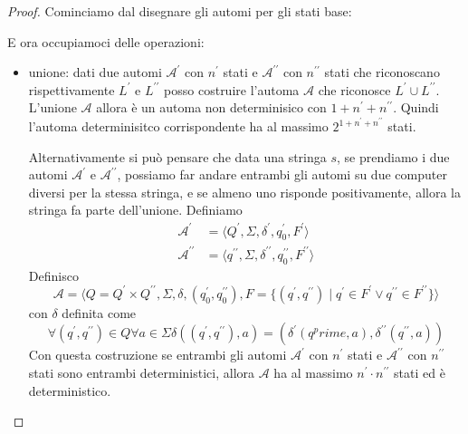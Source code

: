 \documentclass[12pt]{article}
\begin{document}
\tableofcontents
\newpage

\begin{proof}
	Cominciamo dal disegnare gli automi per gli stati base:
	\begin{figure}[h!]
		\centering
		\begin{subfigure}{0.3\textwidth}
			\centering
		\end{subfigure}
		\begin{subfigure}{0.3\textwidth}
			\centering
		\end{subfigure}
		\begin{subfigure}{0.3\textwidth}
			\centering
		\end{subfigure}
	\end{figure}
	E ora occupiamoci delle operazioni:
	\begin{itemize}
		\item unione: dati due automi $\mathcal{A}^\prime$ con $n^\prime$ stati e $\mathcal{A}^{\prime\prime}$ con $n^{\prime\prime}$ stati che riconoscano rispettivamente $L^\prime$ e $L^{\prime\prime}$ posso costruire l'automa $\mathcal{A}$ che riconosce $L^\prime \cup L^{\prime\prime}$.
			L'unione $\mathcal{A}$ allora è un automa non determinisico con $1 + n^\prime + n^{\prime\prime}$.
			Quindi l'automa determinisitco corrispondente ha al massimo $2^{1 + n^\prime + n^{\prime\prime}}$ stati.

			Alternativamente si può pensare che data una stringa $s$, se prendiamo i due automi $\mathcal{A}^\prime$ e $\mathcal{A}^{\prime\prime}$, possiamo far andare entrambi gli automi su due computer diversi per la stessa stringa, e se almeno uno risponde positivamente, allora la stringa fa parte dell'unione.
			Definiamo 
			\begin{align*}
				\mathcal{A}^\prime &= \langle Q^\prime, \Sigma, \delta^\prime, q_0^\prime, F^\prime \rangle \\
				\mathcal{A}^{\prime\prime} &= \langle q^{\prime\prime}, \Sigma, \delta^{\prime\prime}, q_0^{\prime\prime}, F^{\prime\prime} \rangle
			\end{align*}
			Definisco
			$$ \mathcal{A} = \langle Q = Q^\prime \times Q^{\prime\prime}, \Sigma, \delta, (q_0^\prime, q_0^{\prime\prime}), F = \{ (q^\prime, q^{\prime\prime}) \mid q^\prime \in F^\prime \vee q^{\prime\prime} \in F^{\prime\prime} \} \rangle$$
			con $\delta$ definita come
			$$ \forall (q^\prime, q^{\prime\prime}) \in Q \forall a \in \Sigma \delta((q^\prime, q^{\prime\prime}), a) = (\delta^\prime(q^prime, a), \delta^{\prime\prime}(q^{\prime\prime}, a)) $$
			Con questa costruzione se entrambi gli automi $\mathcal{A}^\prime$ con $n^\prime$ stati e $\mathcal{A}^{\prime\prime}$ con $n^{\prime\prime}$ stati sono entrambi deterministici, allora $\mathcal{A}$ ha al massimo $n^\prime \cdot n^{\prime\prime}$ stati ed è deterministico.


\end{itemize}
\end{proof}
\end{document}
